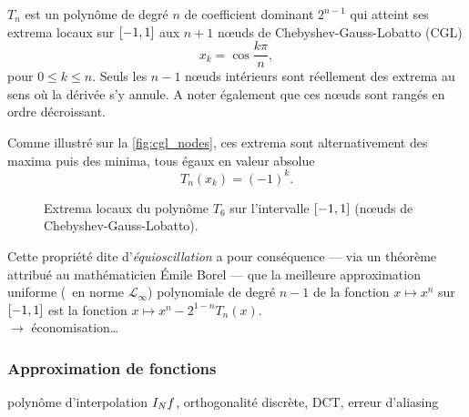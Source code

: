 $T_n$ est un polynôme de degré $n$ de coefficient dominant $2^{n-1}$ qui atteint ses extrema locaux sur $\chebinterval$ aux $n+1$ n\oe uds de Chebyshev-Gauss-Lobatto (CGL)%
\begin{equation}
	x_k = \cos \frac{k \pi}{n},
	\label{eq:cgl_nodes}
\end{equation}
pour $0 \leq k \leq n$. 
Seuls les $n-1$ n\oe uds intérieurs sont réellement des extrema au sens où la dérivée s'y annule. 
A noter également que ces n\oe uds sont rangés en ordre décroissant.\par
Comme illustré sur la \autoref{fig:cgl_nodes}, ces extrema sont alternativement des maxima puis des minima, tous égaux en valeur absolue
\begin{equation}
	T_n(x_k) = (-1)^{k}.
	\label{eq:chebyshev_equioscillation}
\end{equation}

\begin{figure}
	\centering
	
	\caption{Extrema locaux du polynôme $T_6$ sur l'intervalle $\chebinterval$ (n\oe uds de Chebyshev-Gauss-Lobatto).}
	\label{fig:cgl_nodes}
\end{figure}

Cette propriété dite d'\emph{équioscillation} a pour conséquence --- via un théorème attribué au mathématicien Émile Borel --- que la meilleure approximation uniforme (\ie\ en norme $\mathcal{L}_\infty$) polynomiale de degré $n - 1$ de la fonction $x \mapsto x^n$ sur $\chebinterval$ est la fonction $x \mapsto x^n - 2^{1 - n} T_n(x)$. \\
$\to$ économisation\ldots


\subsubsection{Approximation de fonctions}
polynôme d'interpolation $\interpolant{f}{N}$, orthogonalité discrète, DCT, erreur d'aliasing \par\bigskip

